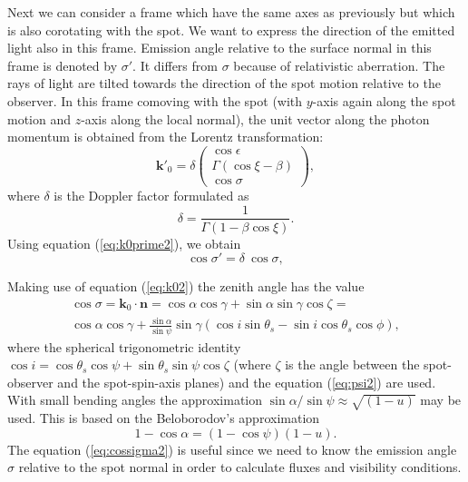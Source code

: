 \documentclass{wihuri}
\def\be{\begin{equation}}
\def\ee{\end{equation}}
\def\Dop{\delta}
\def\thetas{\theta_{s}}
\newcommand{\bmath}[1]{\boldsymbol{#1}}
\begin{document}

Next we can consider a frame which have the same axes as previously but which is also corotating with the spot. We want to express the direction of the emitted light also in this frame. Emission angle relative to the surface normal in this frame is denoted by
$\sigma'$.  It differs from $\sigma$ because of relativistic aberration. The rays of light are tilted towards the direction of the spot motion relative to the observer.
In this frame comoving with the spot 
(with $y$-axis again along the spot motion and $z$-axis along the local normal), 
the unit vector along the photon momentum  is 
obtained from the Lorentz transformation: 
\be \label{eq:k0prime2}
\bmath{k}'_{0} = \Dop
\left( \begin{array}{c}
\cos \epsilon \\
\Gamma (\cos\xi-\beta)\\ 
\cos\sigma
\end{array}
\right) ,
\ee 
where $\delta$ is the Doppler factor formulated as
\be \label{eq:dop2}
\Dop=\frac{1}{\Gamma(1-\beta\cos\xi)} .
\ee
Using equation (\ref{eq:k0prime2}), we obtain
\be \label{eq:aberr2}
\cos\sigma' =   \Dop \ \cos\sigma ,
\ee
 
Making use of equation (\ref{eq:k02}) the zenith angle has the value
\be\label{eq:cossigma2}
\begin{split}
\cos\sigma = \bmath{k}_{0}\cdot\bmath{n} = \cos\alpha\cos\gamma+\sin\alpha\sin\gamma\cos\zeta = \\
\cos \alpha  \cos \gamma + \frac{\sin \alpha}{\sin \psi} \sin \gamma (\cos i \sin \thetas - \sin i \cos \thetas \cos \phi),
\end{split}
\ee
where the spherical trigonometric identity $\cos i = \cos\thetas\cos\psi+\sin\thetas\sin\psi\cos\zeta$ (where $\zeta$ is the angle between the spot-observer and the spot-spin-axis planes) and the equation (\ref{eq:psi2}) are used. With small bending angles the approximation $\sin \alpha / \sin \psi \approx \sqrt{(1-u)}$ may be used. This is based on the Beloborodov's approximation  \cite{beloborodov}
\be \label{eq:beloborodov}
1-\cos \alpha = (1 - \cos \psi)(1 - u).
\ee
The equation (\ref{eq:cossigma2}) is useful since we need to know the emission angle $\sigma$ relative to the spot normal in order to calculate fluxes and visibility conditions. 
\end{document}
